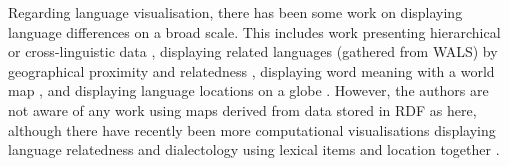 
Regarding language visualisation, there has been some work on displaying language differences on a broad scale. This includes work presenting hierarchical or cross-linguistic data \cite{Rohrdantz:2012, RMB+10}, displaying related languages (gathered from WALS) by geographical proximity and relatedness \cite{LittEACL}, displaying word meaning with a world map \cite{theron}, and displaying language locations on a globe \cite{Haspelmath_etal2008}. However, the authors are not aware of any work using maps derived from data stored in RDF as here, although there have recently been more computational visualisations displaying language relatedness and dialectology using lexical items and location together \cite{10.1371/journal.pone.0023613}. 